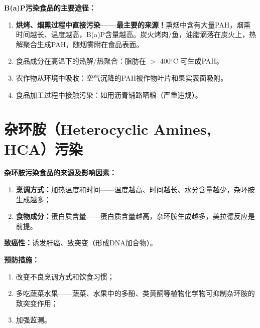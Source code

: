 \begin{keybox}
\textbf{B(a)P污染食品的主要途径：}
\begin{enumerate}[leftmargin=*]
    \item \textbf{烘烤、烟熏过程中直接污染——最主要的来源！}熏烟中含有大量PAH，烟熏时间越长、温度越高，B(a)P含量越高。炭火烤肉/鱼，油脂滴落在炭火上，热解聚合生成PAH，随烟雾附在食品表面。
    \item 食品成分在高温下的热解/热聚合：脂肪在 $>$ 400$^\circ$C 可生成PAH。
    \item 农作物从环境中吸收：空气沉降的PAH被作物叶片和果实表面吸附。
    \item 食品加工过程中接触污染：如用沥青铺路晒粮（严重违规）。
\end{enumerate}
\end{keybox}

\section{杂环胺（Heterocyclic Amines, HCA）污染}

\begin{keybox}
\textbf{杂环胺污染食品的来源及影响因素：}
\begin{enumerate}[leftmargin=*]
    \item \textbf{烹调方式：}加热温度和时间——温度越高、时间越长、水分含量越少，杂环胺生成越多；
    \item \textbf{食物成分：}蛋白质含量——蛋白质含量越高，杂环胺生成越多，美拉德反应是前提。
\end{enumerate}

\textbf{致癌性：}诱发肝癌、致突变（形成DNA加合物）。

\textbf{预防措施：}
\begin{enumerate}[leftmargin=*]
    \item 改变不良烹调方式和饮食习惯；
    \item 多吃蔬菜水果——蔬菜、水果中的多酚、类黄酮等植物化学物可抑制杂环胺的致突变作用；
    \item 加强监测。
\end{enumerate}
\end{keybox}


